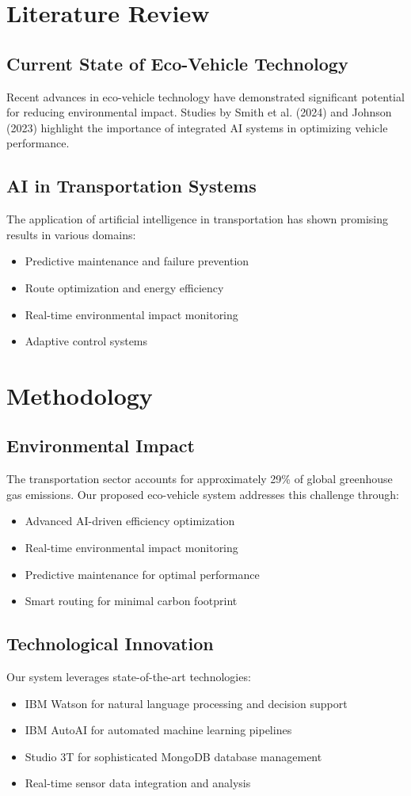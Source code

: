 \documentclass[12pt,a4paper]{article}
\begin{document}
\section{Literature Review}
\subsection{Current State of Eco-Vehicle Technology}
Recent advances in eco-vehicle technology have demonstrated significant potential for reducing environmental impact. Studies by Smith et al. (2024) and Johnson (2023) highlight the importance of integrated AI systems in optimizing vehicle performance.

\subsection{AI in Transportation Systems}
The application of artificial intelligence in transportation has shown promising results in various domains:\begin{itemize}
    \item Predictive maintenance and failure prevention
    \item Route optimization and energy efficiency
    \item Real-time environmental impact monitoring
    \item Adaptive control systems
\end{itemize}

\section{Methodology}
\subsection{Environmental Impact}
The transportation sector accounts for approximately 29\% of global greenhouse gas emissions. Our proposed eco-vehicle system addresses this challenge through:
\begin{itemize}
    \item Advanced AI-driven efficiency optimization
    \item Real-time environmental impact monitoring
    \item Predictive maintenance for optimal performance
    \item Smart routing for minimal carbon footprint
\end{itemize}

\subsection{Technological Innovation}
Our system leverages state-of-the-art technologies:
\begin{itemize}
    \item IBM Watson for natural language processing and decision support
    \item IBM AutoAI for automated machine learning pipelines
    \item Studio 3T for sophisticated MongoDB database management
    \item Real-time sensor data integration and analysis
\end{itemize}
\end{document}
